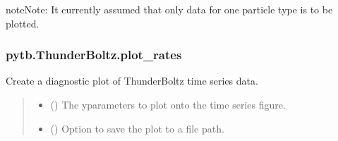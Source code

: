 \documentclass[letterpaper,10pt,english,openany,oneside]{sphinxmanual}
\begin{document}
\begin{fulllineitems}
\begin{fulllineitems}
\begin{sphinxadmonition}{note}{Note:}
\sphinxAtStartPar
It currently assumed that only data for one particle type is to be
plotted.
\end{sphinxadmonition}

\end{fulllineitems}


\sphinxstepscope


\subsubsection{pytb.ThunderBoltz.plot\_rates}
\label{\detokenize{api/pytb.ThunderBoltz.plot_rates:pytb-thunderboltz-plot-rates}}\label{\detokenize{api/pytb.ThunderBoltz.plot_rates::doc}}

\begin{fulllineitems}
\label{\detokenize{api/pytb.ThunderBoltz.plot_rates:pytb.ThunderBoltz.plot_rates}}
\pysigstartsignatures
{}
\pysigstopsignatures
\sphinxAtStartPar
Create a diagnostic plot of ThunderBoltz time series
data.
\begin{quote}\begin{description}
\begin{itemize}
\item {} 
\sphinxAtStartPar
{} (\sphinxstyleliteralemphasis{\sphinxupquote{{[}}}\sphinxstyleliteralemphasis{\sphinxupquote{{]}}}) \textendash{} The y\sphinxhyphen{}parameters to plot onto the time series figure.

\item {} 
\sphinxAtStartPar
{} () \textendash{} Option to save the plot to a file path.


\end{itemize}
\end{description}
\end{quote}
\end{fulllineitems}
\end{fulllineitems}
\end{document}

